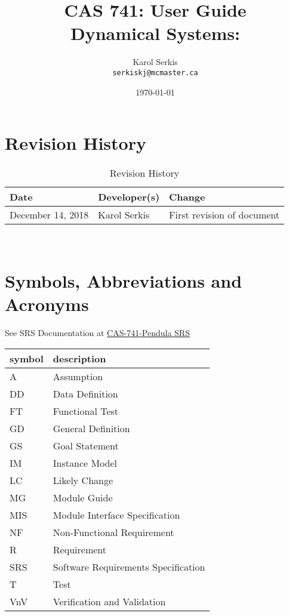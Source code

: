 \documentclass[12pt, titlepage]{article}
\begin{document}
\title{CAS 741: User Guide\\[10pt]
\Large Dynamical Systems: \progname}
\author{Karol Serkis\\\texttt{serkiskj@mcmaster.ca}}

\date{\today}
	
\maketitle


\section{Revision History}

\begin{table}[hp]
\caption{Revision History} \label{TblRevisionHistory}
\begin{tabularx}{\textwidth}{llX}
\toprule
\textbf{Date} & \textbf{Developer(s)} & \textbf{Change}\\
\midrule
December 14, 2018 & Karol Serkis & First revision of document\\
\bottomrule
\end{tabularx}
\end{table}

~\newpage

\section{Symbols, Abbreviations and Acronyms}

See SRS Documentation at 
\href{https://github.com/karolserkis/CAS-741-Pendula/blob/master/docs/SRS/SRS.pdf}
{CAS-741-Pendula SRS}

\renewcommand{\arraystretch}{1.2}
\begin{tabular}{l l} 
  \toprule		
  \textbf{symbol} & \textbf{description}\\
  \midrule 
  A & Assumption\\
  DD & Data Definition\\
  FT & Functional Test \\
  GD & General Definition\\
  GS & Goal Statement\\
  IM & Instance Model\\
  LC & Likely Change\\
  MG & Module Guide\\ 
  MIS & Module Interface Specification\\ 
  NF & Non-Functional Requirement\\
  R & Requirement\\
  SRS & Software Requirements Specification\\
  T & Test\\
  VnV & Verification and Validation\\ 
  \bottomrule
\end{tabular}\\
\end{document}

